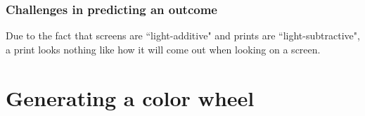 \documentclass{article}
\begin{document}
\begin{multicols}{2}
\subsubsection{Challenges in predicting an outcome}

Due to the fact that screens are ``light-additive" and prints are ``light-subtractive", a print looks nothing like how it will come out when looking on a screen.

\section{Generating a color wheel}

\end{multicols}
\end{document}
